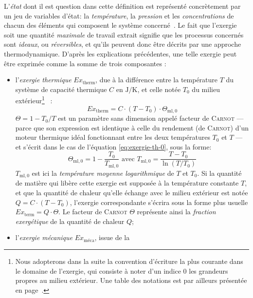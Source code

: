 \documentclass[a4paper,11pt]{scrartcl}
\begin{document}
L'\emph{état} dont il est question dans cette définition est représenté
concrètement par un jeu de variables d'état: la \emph{température}, la
\emph{pression} et les \emph{concentrations} de chacun des éléments qui
composent le système concerné~\cite{TI-BE8015}. Le fait que l'exergie soit une quantité \emph{maximale} de travail extrait signifie que les processus concernés sont \emph{ideaux}, ou \emph{réversibles}, et qu'ils peuvent donc être décrits par une approche thermodynamique. D'après les explications
précédentes, une telle exergie peut être exprimée comme la somme de trois
composantes : \begin{itemize}
	\item l'\emph{exergie thermique} $Ex_{\text{therm}}$, due à la
		différence entre la température $T$ du système de capacité
		thermique $C$ en $\mathrm{J/K}$, et celle notée $T_0$ du milieu
		extérieur\footnote{Nous adopterons dans la suite la
		convention d'écriture la plus courante dans le domaine de
		l'exergie, qui consiste à noter d'un indice $0$ les grandeurs
		propres au milieu extérieur. Une table des notations est par
		ailleurs présentée en
		page~\pageref{table-notations}.}~\cite{entropie-157-0013-0020} :
		\begin{equation}
			Ex_{\text{therm}} = C \cdot (T-T_0) \cdot
			\Theta_{\text{ml},0} \label{eq:exergie-th-0}
		\end{equation} $\Theta=1-T_0/T$ est un paramètre sans dimension
		appelé facteur de \textsc{Carnot} --- parce que son expression
		est identique à celle du rendement (de \textsc{Carnot}) d'un
		moteur thermique idéal fonctionnant entre les deux températures
		$T_0$ et $T$ --- et s'écrit dans le cas de l'équation
		\eqref{eq:exergie-th-0}, sous la forme: \begin{equation}
			\Theta_{\text{ml},0} = 1 - \frac{T_0}{T_{\text{ml},0}}
			\text{ avec } T_{\text{ml},0} =
			\frac{T-T_0}{\ln(T/T_0)}
		\end{equation} $T_{\text{ml},0}$ est ici la \emph{température
		moyenne logarithmique} de $T$ et $T_0$. Si la quantité de matière qui libère cette exergie est supposée à la température constante $T$, et que la quantité de chaleur qu'elle échange avec le milieu extérieur est notée $Q = C \cdot (T-T_0)$, l'exergie correspondante s'écrira sous la forme plus usuelle $Ex_{\text{term}} = Q \cdot \Theta$. Le facteur de \textsc{Carnot} $\Theta$ représente ainsi la \emph{fraction exergétique} de la quantité de chaleur $Q$;
	\item l'\emph{exergie mécanique} $Ex_{\text{méca}}$, issue de la

\end{itemize}
\end{document}
